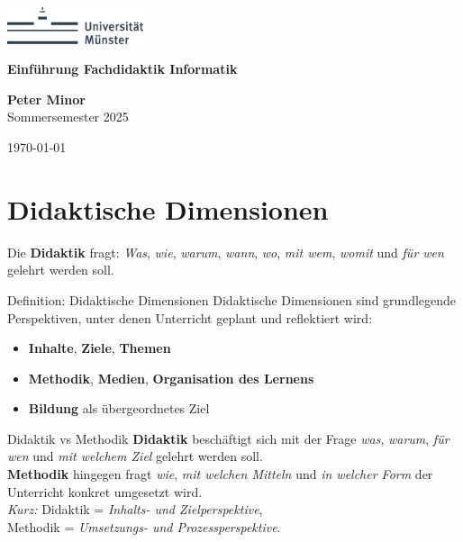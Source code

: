 \documentclass{article}
\begin{document}
\begin{titlepage}
    \centering
    \includegraphics[width=0.3\textwidth]{Uni Logo.png} 
    \vspace*{2cm}
    
    {\Large\bfseries Einführung Fachdidaktik Informatik\par}
    \vspace{1.5cm}
    
    \textbf{Peter Minor}\\
    Sommersemester 2025
    
    \vfill    
    \vspace{1.5cm}
    {\large \today\par}
\end{titlepage}

\tableofcontents

\newpage

\section{Didaktische Dimensionen}
Die \textbf{Didaktik} fragt: \emph{Was}, \emph{wie}, \emph{warum}, \emph{wann}, \emph{wo}, \emph{mit wem}, \emph{womit} und \emph{für wen} gelehrt werden soll.

\begin{block}{Definition: Didaktische Dimensionen}
    Didaktische Dimensionen sind grundlegende Perspektiven, unter denen Unterricht geplant und reflektiert wird:
    \begin{itemize}
        \item \textbf{Inhalte}, \textbf{Ziele}, \textbf{Themen}
        \item \textbf{Methodik}, \textbf{Medien}, \textbf{Organisation des Lernens}
        \item \textbf{Bildung} als übergeordnetes Ziel
    \end{itemize}
\end{block}

\begin{block}{Didaktik vs Methodik}
    \textbf{Didaktik} beschäftigt sich mit der Frage \emph{was}, \emph{warum}, \emph{für wen} und \emph{mit welchem Ziel} gelehrt werden soll. \\
    \textbf{Methodik} hingegen fragt \emph{wie}, \emph{mit welchen Mitteln} und \emph{in welcher Form} der Unterricht konkret umgesetzt wird. \\[0.5em]
    \textit{Kurz:} Didaktik = \emph{Inhalts- und Zielperspektive},\\ \quad Methodik = \emph{Umsetzungs- und Prozessperspektive}.
\end{block}
\end{document}

